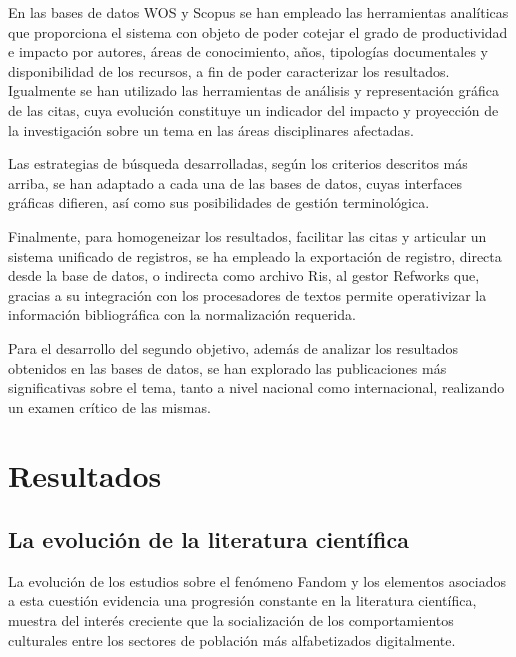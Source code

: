 \documentclass[spanish]{textolivre}
\begin{document}
En las bases de datos WOS y Scopus se han empleado las herramientas analíticas que proporciona el sistema con objeto de poder cotejar el grado de productividad e impacto por autores, áreas de conocimiento, años, tipologías documentales y disponibilidad de los recursos, a fin de poder caracterizar los resultados. Igualmente se han utilizado las herramientas de análisis y representación gráfica de las citas, cuya evolución constituye un indicador del impacto y proyección de la investigación sobre un tema en las áreas disciplinares afectadas.

Las estrategias de búsqueda desarrolladas, según los criterios descritos más arriba, se han adaptado a cada una de las bases de datos, cuyas interfaces gráficas difieren, así como sus posibilidades de gestión terminológica. 

Finalmente, para homogeneizar los resultados, facilitar las citas y articular un sistema unificado de registros, se ha empleado la exportación de registro, directa desde la base de datos, o indirecta como archivo Ris, al gestor Refworks que, gracias a su integración con los procesadores de textos permite operativizar la información bibliográfica con la normalización requerida.
	
Para el desarrollo del segundo objetivo, además de analizar los resultados obtenidos en las bases de datos, se han explorado las publicaciones más significativas sobre el tema, tanto a nivel nacional como internacional, realizando un examen crítico de las mismas.

\section{Resultados}\label{sec-conduta}

\subsection{La evolución de la literatura científica}
La evolución de los estudios sobre el fenómeno Fandom y los elementos asociados a esta cuestión evidencia una progresión constante en la literatura científica, muestra del interés creciente que la socialización de los comportamientos culturales entre los sectores de población más alfabetizados digitalmente. 
\end{document}
